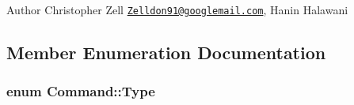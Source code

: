\begin{DoxyAuthor}{Author}
Christopher Zell \href{mailto:Zelldon91@googlemail.com}{\tt Zelldon91@googlemail.\-com}, Hanin Halawani 
\end{DoxyAuthor}


\subsection{Member Enumeration Documentation}
\hypertarget{structCommand_a4ca33b8d40e12deca5e7bb4190426ee1}{
\subsubsection[{Type}]{\setlength{\rightskip}{0pt plus 5cm}enum {\bf Command\-::\-Type}}}\label{structCommand_a4ca33b8d40e12deca5e7bb4190426ee1}
